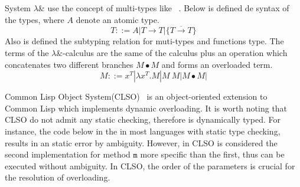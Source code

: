\documentclass[hidelinks, twocolumn]{article}
\begin{document}
System $\lambda$\& use the concept of multi-types like ~\cite{BETTINI2009261, FJM}. Below is defined de syntax of the types, where $A$ denote an atomic type.
\[T ::= A| T \to T|\{\overline{T \to T}\}\]
Also is defined the subtyping relation for muti-types and functions type. The terms of the  $\lambda$\&-calculus are the same of the   calculus plus an operation which concatenates two different branches $ M \bullet M$ and forms an overloaded term. 
\[M ::= x^T| \lambda x^T. M| M \ M| M \bullet M|\]



\medskip 



Common Lisp Object System(CLSO)~\cite{Bobrow:1988:CLO:885631.885632} is an object-oriented extension to Common Lisp which implements dynamic overloading. It is worth noting that CLSO do not admit any static checking, therefore is dynamically typed. For instance, the code below in the in most languages with static type checking, results in an static error by ambiguity. However, in CLSO is considered the second implementation for  method $\texttt{m}$ more specific than the first, thus can be executed without ambiguity. In CLSO, the order of the parameters is crucial for the resolution of overloading.\\


\end{document}
